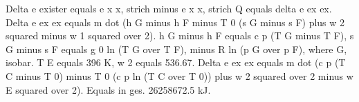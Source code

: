 Delta e exister equals e x x, strich minus e x x, strich Q equals delta e ex ex.
Delta e ex ex equals m dot (h G minus h F minus T 0 (s G minus s F) plus w 2 squared minus w 1 squared over 2).
h G minus h F equals c p (T G minus T F), s G minus s F equals g 0 ln (T G over T F), minus R ln (p G over p F), where G, isobar.
T E equals 396 K, w 2 equals 536.67.
Delta e ex ex equals m dot (c p (T C minus T 0) minus T 0 (c p ln (T C over T 0)) plus w 2 squared over 2 minus w E squared over 2).
Equals in ges. 26258672.5 kJ.